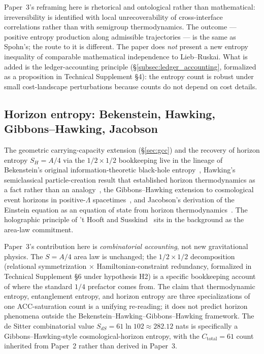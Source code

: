 \documentclass[11pt]{article}
\begin{document}
Paper~3's reframing here is rhetorical and ontological rather than
mathematical: irreversibility is identified with local unrecoverability of
cross-interface correlations rather than with semigroup thermodynamics.
The outcome --- positive entropy production along admissible trajectories
--- is the same as Spohn's; the route to it is different.  The paper does
\emph{not} present a new entropy inequality of comparable mathematical
independence to Lieb--Ruskai.  What is added is the ledger-accounting
principle (\S\ref{subsec:ledger_accounting}, formalized as a proposition in
Technical Supplement \S 4): the entropy count is robust under small
cost-landscape perturbations because counts do not depend on cost details.

\subsection{Horizon entropy: Bekenstein, Hawking, Gibbons--Hawking, Jacobson}

The geometric carrying-capacity extension (\S\ref{sec:gcc}) and the recovery
of horizon entropy $S_H = A/4$ via the $1/2 \times 1/2$ bookkeeping live in
the lineage of Bekenstein's original information-theoretic black-hole
entropy~\cite{Bekenstein1973}, Hawking's semiclassical particle-creation
result that established horizon thermodynamics as a fact rather than an
analogy~\cite{Hawking1975}, the Gibbons--Hawking extension to cosmological
event horizons in positive-$\Lambda$ spacetimes~\cite{GibbonsHawking1977},
and Jacobson's derivation of the Einstein equation as an equation of state
from horizon thermodynamics~\cite{Jacobson1995}.  The holographic principle
of 't Hooft and Susskind~\cite{tHooft1993,Susskind1995} sits in the
background as the area-law commitment.

Paper~3's contribution here is \emph{combinatorial accounting}, not new
gravitational physics.  The $S = A/4$ area law is unchanged; the
$1/2 \times 1/2$ decomposition (relational symmetrization $\times$
Hamiltonian-constraint redundancy, formalized in Technical Supplement \S 6
under hypothesis H2) is a specific bookkeeping account of where the standard
$1/4$ prefactor comes from.  The claim that thermodynamic entropy,
entanglement entropy, and horizon entropy are three specializations of one
ACC-saturation count is a unifying re-reading; it does not predict horizon
phenomena outside the Bekenstein--Hawking--Gibbons--Hawking framework.  The
de Sitter combinatorial value $S_{dS} = 61\ln 102 \approx 282.12$ nats is
specifically a Gibbons--Hawking-style cosmological-horizon entropy, with the
$C_{\mathrm{total}} = 61$ count inherited from Paper~2 rather than derived
in Paper~3.
\end{document}
